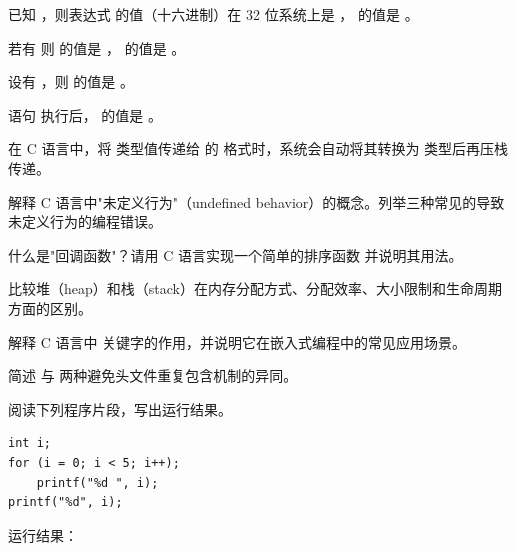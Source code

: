 \documentclass[a4paper,11pt]{article}
\begin{document}
\examtitle


\anslines{0.1cm}

\q 已知 ，则表达式  的值（十六进制）在 32 位系统上是 \fillblank ， 的值是 \fillblank 。

\q 若有  则  的值是 \fillblank ， 的值是 \fillblank 。

\q 设有 ，则  的值是 \fillblank 。

\q 语句  执行后， 的值是 \fillblank 。

\q 在 C 语言中，将  类型值传递给  的  格式时，系统会自动将其转换为 \fillblank 类型后再压栈传递。


\q 解释 C 语言中"未定义行为"（undefined behavior）的概念。列举三种常见的导致未定义行为的编程错误。
\anslines{1.5cm}

\q 什么是"回调函数"？请用 C 语言实现一个简单的排序函数  并说明其用法。
\anslines{1.5cm}

\q 比较堆（heap）和栈（stack）在内存分配方式、分配效率、大小限制和生命周期方面的区别。
\anslines{1.5cm}

\q 解释 C 语言中  关键字的作用，并说明它在嵌入式编程中的常见应用场景。
\anslines{1.5cm}

\q 简述  与  两种避免头文件重复包含机制的异同。
\anslines{1.5cm}


阅读下列程序片段，写出运行结果。

\q
\begin{lstlisting}[language={[custom]C}]
int i;
for (i = 0; i < 5; i++);
    printf("%d ", i);
printf("%d", i);
\end{lstlisting}
运行结果：\underline{\hspace{3cm}}
\end{document}
